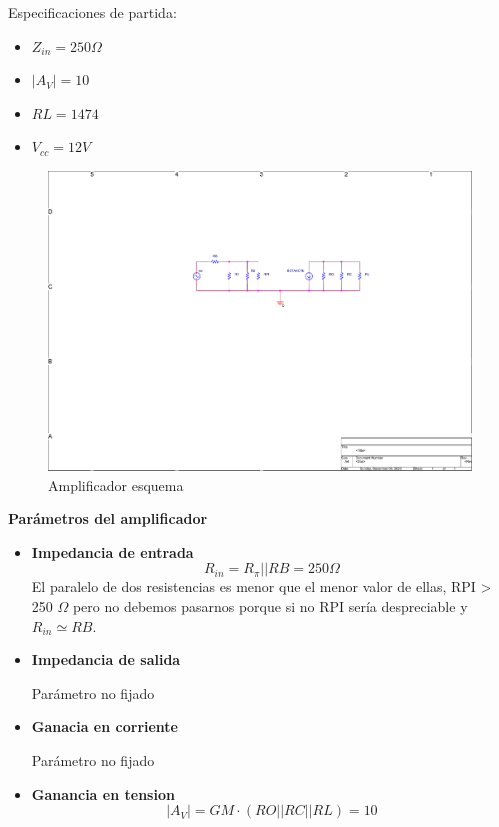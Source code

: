 Especificaciones de partida:
\begin{itemize}
\item $Z_{in}=250 \Omega$
\item $|A_V|=10$
\item $RL=1474$
\item $V_{cc}=12V$
\end{itemize}

    \begin{figure}[H]
    \centering  
    \includegraphics[scale=1,page=1,clip, trim=8cm 12cm 6cm 5cm]{images/modelo pi simplificado.pdf}
    \caption{Amplificador esquema}
  \end{figure}
  
\begin{center}
\large\textbf{Parámetros del amplificador}
\end{center}

\begin{itemize}
\item \textbf{Impedancia de entrada}
  \[R_{in}=R_{\pi}||RB = 250 \Omega \]
  El paralelo de dos resistencias es menor que el menor valor de
  ellas, RPI > 250 $\Omega$ pero no debemos pasarnos porque si no RPI
  sería despreciable y $R_{in} \simeq RB$.
\item \textbf{Impedancia de salida}
\begin{center}
Parámetro no fijado
\end{center}
\item \textbf{Ganacia en corriente}
\begin{center}
Parámetro no fijado
\end{center}
\item \textbf{Ganancia en tension}
\[|A_{V}| = GM\cdot(RO||RC||RL) = 10\]
\end{itemize}

